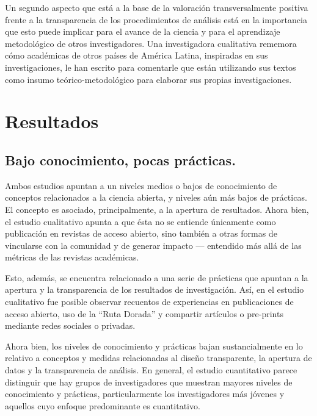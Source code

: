 \documentclass[
  letterpaper,
  DIV=11,
  numbers=noendperiod]{scrreprt}
\begin{document}
Un segundo aspecto que está a la base de la valoración transversalmente
positiva frente a la transparencia de los procedimientos de análisis
está en la importancia que esto puede implicar para el avance de la
ciencia y para el aprendizaje metodológico de otros investigadores. Una
investigadora cualitativa rememora cómo académicas de otros países de
América Latina, inspiradas en sus investigaciones, le han escrito para
comentarle que están utilizando sus textos como insumo
teórico-metodológico para elaborar sus propias investigaciones.


\chapter{Resultados}\label{resultados}

\section{Bajo conocimiento, pocas
prácticas.}\label{bajo-conocimiento-pocas-pruxe1cticas.}

Ambos estudios apuntan a un niveles medios o bajos de conocimiento de
conceptos relacionados a la ciencia abierta, y niveles aún más bajos de
prácticas. El concepto es asociado, principalmente, a la apertura de
resultados. Ahora bien, el estudio cualitativo apunta a que ésta no se
entiende únicamente como publicación en revistas de acceso abierto, sino
también a otras formas de vincularse con la comunidad y de generar
impacto --- entendido más allá de las métricas de las revistas
académicas.

Esto, además, se encuentra relacionado a una serie de prácticas que
apuntan a la apertura y la transparencia de los resultados de
investigación. Así, en el estudio cualitativo fue posible observar
recuentos de experiencias en publicaciones de acceso abierto, uso de la
``Ruta Dorada'' y compartir artículos o pre-prints mediante redes
sociales o privadas.

Ahora bien, los niveles de conocimiento y prácticas bajan
sustancialmente en lo relativo a conceptos y medidas relacionadas al
diseño transparente, la apertura de datos y la transparencia de
análisis. En general, el estudio cuantitativo parece distinguir que hay
grupos de investigadores que muestran mayores niveles de conocimiento y
prácticas, particularmente los investigadores más jóvenes y aquellos
cuyo enfoque predominante es cuantitativo.
\end{document}
